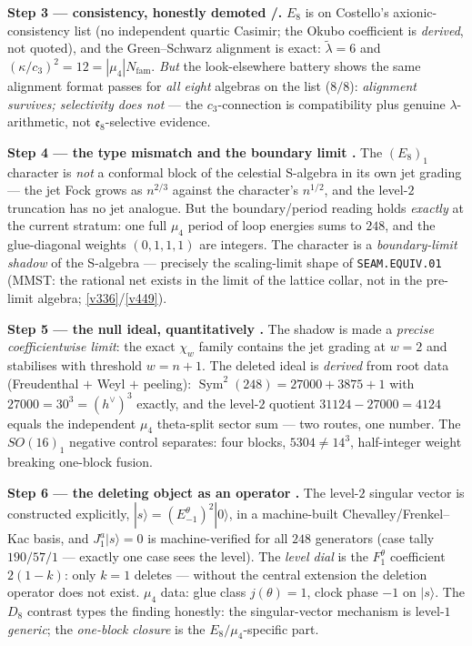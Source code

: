 \documentclass[11pt,a4paper]{article}
\newcommand{\Nfam}{N_{\mathrm{fam}}}
\newcommand{\cthree}{c_3}
\theoremstyle{definition}
\begin{document}
\par\smallskip\noindent\textbf{Step 3 --- consistency, honestly demoted \mE/\mC.}
$E_8$ is on Costello's axionic-consistency list (no
independent quartic Casimir; the Okubo coefficient is \emph{derived}, not quoted), and the Green--Schwarz
alignment is exact: $\tilde\lambda=6$ and $(\kappa/\cthree)^2=12=|\mu_4|\Nfam$. \emph{But} the
look-elsewhere battery shows the same alignment format passes for \emph{all eight} algebras on the list
($8/8$): \emph{alignment survives; selectivity does not} --- the $\cthree$-connection is compatibility
plus genuine $\lambda$-arithmetic, not $\mathfrak e_8$-selective evidence.

\par\smallskip\noindent\textbf{Step 4 --- the type mismatch and the boundary limit \mE.}
The $(E_8)_1$ character is \emph{not} a conformal
block of the celestial S-algebra in its own jet grading --- the jet Fock grows as $n^{2/3}$ against the
character's $n^{1/2}$, and the level-$2$ truncation has no jet analogue. But the boundary/period reading
holds \emph{exactly} at the current stratum: one full $\mu_4$ period of loop energies sums to $248$, and
the glue-diagonal weights $(0,1,1,1)$ are integers. The character is a \emph{boundary-limit shadow} of
the S-algebra --- precisely the scaling-limit shape of \texttt{SEAM.EQUIV.01} (MMST: the rational net
exists in the limit of the lattice collar, not in the pre-limit algebra; \vref{v336}/\vref{v449}).

\par\smallskip\noindent\textbf{Step 5 --- the null ideal, quantitatively \mE.}
The shadow is made a \emph{precise coefficientwise
limit}: the exact $\chi_w$ family contains the jet grading at $w{=}2$ and stabilises with threshold
$w=n{+}1$. The deleted ideal is \emph{derived} from root data (Freudenthal $+$ Weyl $+$ peeling):
$\operatorname{Sym}^2(248)=27000{+}3875{+}1$ with $27000=30^3=(h^\vee)^3$ exactly, and the level-$2$
quotient $31124{-}27000=4124$ equals the independent $\mu_4$ theta-split sector sum --- two routes, one
number. The $SO(16)_1$ negative control separates: four blocks, $5304\neq14^3$, half-integer weight
breaking one-block fusion. 

\par\smallskip\noindent\textbf{Step 6 --- the deleting object as an operator \mE.}
The level-$2$ singular vector is constructed
explicitly, $|s\rangle=(E^\theta_{-1})^2|0\rangle$, in a machine-built Chevalley/Frenkel--Kac basis, and
$J^a_1|s\rangle=0$ is machine-verified for all $248$ generators (case tally $190/57/1$ --- exactly one
case sees the level). The \emph{level dial} is the $F^\theta_1$ coefficient $2(1{-}k)$: only $k{=}1$
deletes --- without the central extension the deletion operator does not exist. $\mu_4$ data: glue class
$j(\theta)=1$, clock phase $-1$ on $|s\rangle$. The $D_8$ contrast types the finding honestly: the
singular-vector mechanism is level-$1$ \emph{generic}; the \emph{one-block closure} is the
$E_8/\mu_4$-specific part. 
\end{document}
